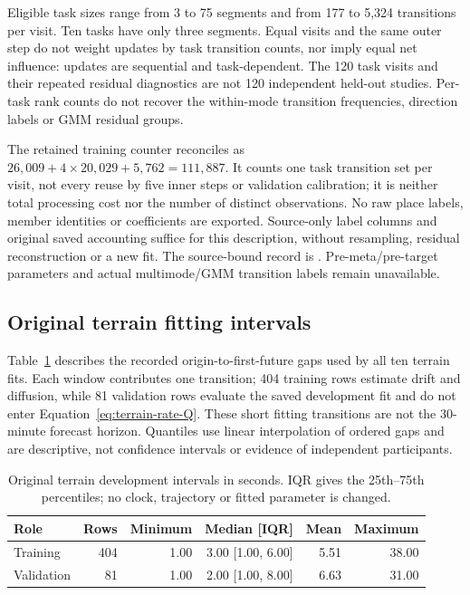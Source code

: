 \documentclass[11pt]{article}
\begin{document}
Eligible task sizes range from 3 to 75 segments and from 177 to 5,324
transitions per visit. Ten tasks have only three segments. Equal visits
and the same outer step do not weight updates by task transition counts,
nor imply equal net influence: updates are sequential and task-dependent.
The 120 task visits and their repeated residual diagnostics are not 120
independent held-out studies. Per-task rank counts do not recover the
within-mode transition frequencies, direction labels or GMM residual groups.

The retained training counter reconciles as
\(26{,}009+4\times20{,}029+5{,}762=111{,}887\).
It counts one task transition set per visit, not every reuse by five inner
steps or validation calibration; it is neither total processing cost nor
the number of distinct observations. No raw place labels, member identities
or coefficients are exported. Source-only label columns and original saved
accounting suffice for this description, without resampling, residual
reconstruction or a new fit. The source-bound record is
. Pre-meta/pre-target
parameters and actual multimode/GMM transition labels remain unavailable.

\subsection{Original terrain fitting intervals}
\label{sec:terrain-fit-intervals}
Table~\ref{tab:terrain-fit-intervals} describes the recorded origin-to-first-future
gaps used by all ten terrain fits. Each window contributes one transition;
404 training rows estimate drift and diffusion, while 81 validation rows
evaluate the saved development fit and do not enter Equation~\eqref{eq:terrain-rate-Q}.
These short fitting transitions are not the 30-minute forecast horizon.
Quantiles use linear interpolation of ordered gaps and are descriptive,
not confidence intervals or evidence of independent participants.

\begin{table}[htbp]
\centering\footnotesize
\caption{Original terrain development intervals in seconds. IQR gives
the 25th--75th percentiles; no clock, trajectory or fitted parameter is changed.}
\label{tab:terrain-fit-intervals}
\begin{tabular}{lrrrrr}
\toprule
Role & Rows & Minimum & Median [IQR] & Mean & Maximum\\
\midrule
Training & 404 & 1.00 & 3.00 [1.00, 6.00] & 5.51 & 38.00\\
Validation & 81 & 1.00 & 2.00 [1.00, 8.00] & 6.63 & 31.00\\
\bottomrule
\end{tabular}
\end{table}
\end{document}
